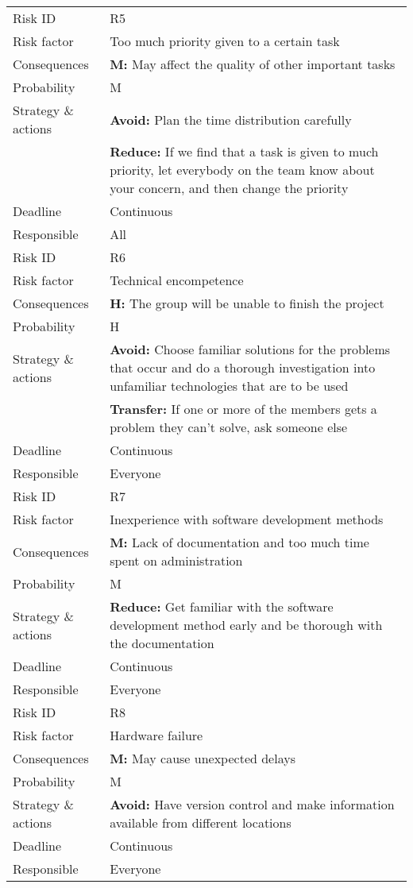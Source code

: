 \begin{longtable}{>{\setlength\hsize{.3\hsize}}X|>{\setlength\hsize{0.7\hsize}}X}
Risk ID & R5 \\
Risk factor & Too much priority given to a certain task \\
Consequences & \textbf{M:} May affect the quality of other important tasks \\
Probability & M \\
Strategy \& actions & \textbf{Avoid:} Plan the time distribution carefully\\
 & \textbf{Reduce:} If we find that a task is given to much priority, let everybody on the team know about your concern, and then change the priority \\
Deadline & Continuous \\
Responsible & All \\ \hline

Risk ID & R6 \\
Risk factor & Technical encompetence \\
Consequences & \textbf{H:} The group will be unable to finish the project \\
Probability & H \\
Strategy \& actions & \textbf{Avoid:} Choose familiar solutions for the problems that occur and do a thorough investigation into unfamiliar technologies that are to be used\\
 & \textbf{Transfer:} If one or more of the members gets a problem they can't solve, ask someone else \\
Deadline & Continuous \\
Responsible & Everyone \\ \hline

Risk ID & R7 \\
Risk factor & Inexperience with software development methods \\
Consequences & \textbf{M:} Lack of documentation and too much time spent on administration \\
Probability & M \\
Strategy \& actions & \textbf{Reduce:} Get familiar with the software development method early and be thorough with the documentation \\
Deadline & Continuous \\
Responsible & Everyone \\ \hline

Risk ID & R8 \\
Risk factor & Hardware failure \\
Consequences & \textbf{M:} May cause unexpected delays \\
Probability & M \\
Strategy \& actions & \textbf{Avoid:} Have version control and make information available from different locations \\
Deadline & Continuous \\
Responsible & Everyone \\ \hline


\end{longtable}
